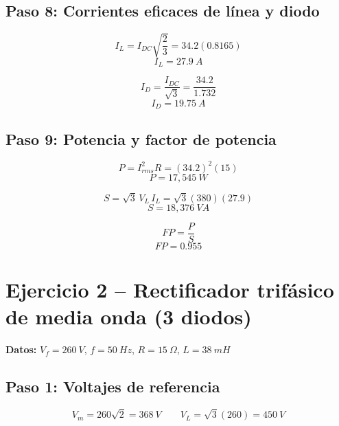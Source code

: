 \documentclass[12pt]{article}
\begin{document}
\subsection*{Paso 8: Corrientes eficaces de línea y diodo}
\begin{equation}
I_L=I_{DC}\sqrt{\frac{2}{3}}=34.2(0.8165)
\end{equation}
\begin{equation}
\boxed{I_L=27.9\ A}
\end{equation}

\begin{equation}
I_D=\frac{I_{DC}}{\sqrt3}=\frac{34.2}{1.732}
\end{equation}
\begin{equation}
\boxed{I_D=19.75\ A}
\end{equation}

\subsection*{Paso 9: Potencia y factor de potencia}
\begin{equation}
P=I_{rms}^2R=(34.2)^2(15)
\end{equation}
\begin{equation}
\boxed{P=17{,}545\ W}
\end{equation}

\begin{equation}
S=\sqrt3\,V_L\,I_L=\sqrt3(380)(27.9)
\end{equation}
\begin{equation}
\boxed{S=18{,}376\ VA}
\end{equation}

\begin{equation}
FP=\frac{P}{S}
\end{equation}
\begin{equation}
\boxed{FP=0.955}
\end{equation}

\newpage
\section{Ejercicio 2 -- Rectificador trifásico de media onda (3 diodos)}

\textbf{Datos:} $V_f = 260\ V$, $f = 50\ Hz$, $R = 15\ \Omega$, $L = 38\ mH$

\subsection*{Paso 1: Voltajes de referencia}
\begin{equation}
V_m=260\sqrt2=368\ V \qquad V_L=\sqrt3(260)=450\ V
\end{equation}
\end{document}

